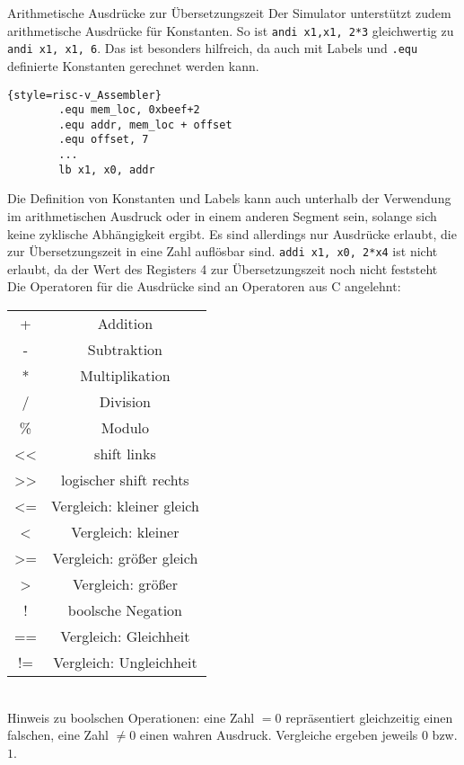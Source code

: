 {\begin{infoblock}{Arithmetische Ausdrücke zur Übersetzungszeit}
	Der Simulator unterstützt zudem arithmetische Ausdrücke für Konstanten. So ist \texttt{andi x1,x1, 2*3} gleichwertig zu \texttt{andi x1, x1, 6}. Das ist besonders hilfreich, da auch mit Labels und \texttt{.equ} definierte Konstanten gerechnet werden kann.\\
	\begin{lstlisting}{style=risc-v_Assembler}
		.equ mem_loc, 0xbeef+2
		.equ addr, mem_loc + offset
		.equ offset, 7
		...
		lb x1, x0, addr
	\end{lstlisting}
	Die Definition von Konstanten und Labels kann auch unterhalb der Verwendung im arithmetischen Ausdruck oder in einem anderen Segment sein, solange sich keine zyklische Abhängigkeit ergibt. Es sind allerdings nur Ausdrücke erlaubt, die zur Übersetzungszeit in eine Zahl auflösbar sind. \texttt{addi x1, x0, 2*x4} ist nicht erlaubt, da der Wert des Registers 4 zur Übersetzungszeit noch nicht feststeht\\
	Die Operatoren für die Ausdrücke sind an Operatoren aus C angelehnt:\\
		\begin{tabular}{|c|c|}
			+ & Addition \\
			- & Subtraktion \\
			* & Multiplikation \\
			/ & Division \\
			\% & Modulo \\
			<< & shift links\\
			>> & logischer shift rechts\\
			<= & Vergleich: kleiner gleich\\
			< & Vergleich: kleiner\\
			>= & Vergleich: größer gleich\\
			> & Vergleich: größer\\
			! & boolsche Negation\\
			== & Vergleich: Gleichheit\\
			!= & Vergleich: Ungleichheit\\
		\end{tabular}\\
	Hinweis zu boolschen Operationen: eine Zahl $=0$ repräsentiert gleichzeitig einen falschen, eine Zahl $\neq 0$ einen wahren Ausdruck. Vergleiche ergeben jeweils $0$ bzw. $1$.
\end{infoblock}

}
